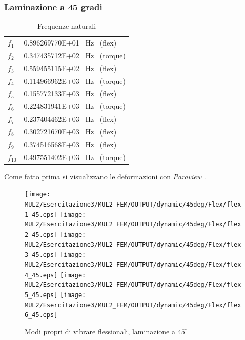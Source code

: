 \documentclass{article}
\begin{document}
            \clearpage

            \subsubsection{Laminazione a 45 gradi \label{Esercitazione3_freq_nat_45}}

            \begin{table}[h!]
                \centering
                \begin{tabular}{@{}ll@{}}
                \toprule
                $f_1$    & 0.896269770E+01  \ Hz \ (flex) \\
                $f_2$    & 0.347435712E+02  \ Hz \ (torque) \\
                $f_3$    & 0.559455115E+02  \ Hz \ (flex) \\
                $f_4$    & 0.114966962E+03  \ Hz \ (torque) \\
                $f_5$    & 0.155772133E+03  \ Hz \ (flex) \\
                $f_6$    & 0.224831941E+03  \ Hz \ (torque) \\
                $f_7$    & 0.237404462E+03  \ Hz \ (flex) \\
                $f_8$    & 0.302721670E+03  \ Hz \ (flex) \\
                $f_9$    & 0.374516568E+03  \ Hz \ (flex) \\
                $f_{10}$ & 0.497551402E+03  \ Hz \ (torque) \\ \bottomrule
            \end{tabular}
            \caption{Frequenze naturali}
            \label{tab:freq_nat_45}
            \end{table}
        
        Come fatto prima si visualizzano le deformazioni con \textit{Paraview} \autocite{Paraview}. 

        \clearpage

        \begin{figure}[h!]
             \label{fig:freq_nat_flex_45}
            \texttt{[image: MUL2/Esercitazione3/MUL2\_FEM/OUTPUT/dynamic/45deg/Flex/flex1\_45.eps]}
            \texttt{[image: MUL2/Esercitazione3/MUL2\_FEM/OUTPUT/dynamic/45deg/Flex/flex2\_45.eps]}
            \texttt{[image: MUL2/Esercitazione3/MUL2\_FEM/OUTPUT/dynamic/45deg/Flex/flex3\_45.eps]}
            \texttt{[image: MUL2/Esercitazione3/MUL2\_FEM/OUTPUT/dynamic/45deg/Flex/flex4\_45.eps]}
            \texttt{[image: MUL2/Esercitazione3/MUL2\_FEM/OUTPUT/dynamic/45deg/Flex/flex5\_45.eps]}
            \texttt{[image: MUL2/Esercitazione3/MUL2\_FEM/OUTPUT/dynamic/45deg/Flex/flex6\_45.eps]}
            \caption{Modi propri di vibrare flessionali, laminazione a $45^\circ$}
        \end{figure}
\end{document}
